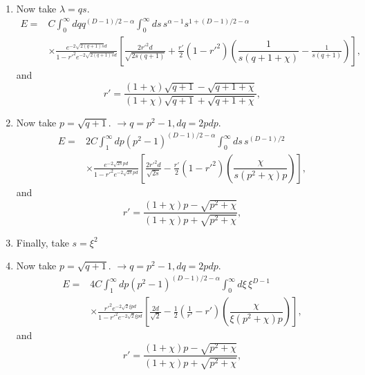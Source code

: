 \begin{enumerate}
\item Now take $\lambda = qs$.  
 \begin{align}
E=&  C\int_0^\infty dq q^{(D-1)/2-\alpha}\int_0^\infty ds\, s^{\alpha-1}s^{1+(D-1)/2-\alpha}\nonumber\\
&\times  \frac{e^{-2\sqrt{2(q+1)s}d}}{1-r'^2e^{-2\sqrt{2(q+1)s}d}}\left[
\frac{2r'^2d}{\sqrt{2s(q+1)}}+ \frac{r'}{2}(1-r'^2)\left(\dfrac{1}{s(q+1+\chi)}  -\frac{1}{s(q+1)}\right)\right],
\end{align}
and 
\begin{equation}
r' =  \frac{(1+\chi)\sqrt{q+1}-\sqrt{q+ 1 + \chi}}{(1+\chi)\sqrt{q+1}+\sqrt{q+1+\chi}},
\end{equation}
\item Now take $p = \sqrt{q+1}$.  $\rightarrow  q = p^2-1, dq = 2p dp$.  
 \begin{align}
E%
=&  2C\int_1^\infty dp (p^2-1)^{(D-1)/2-\alpha}\int_0^\infty ds\, s^{(D-1)/2}\nonumber\\
&\times\frac{e^{-2\sqrt{2s}pd}}{1-r'^2e^{-2\sqrt{2s}pd}}\left[\frac{2r'^2d}{\sqrt{2s}}- 
\frac{r'}{2}(1-r'^2)\left(\dfrac{\chi}{s(p^2+\chi)p}\right)\right],
\end{align}
and 
\begin{equation}
r' =  \frac{(1+\chi)p-\sqrt{p^2 + \chi}}{(1+\chi)p+\sqrt{p^2+\chi}},
\end{equation}
\item Finally, take 
$s = \xi^2$
\item Now take $p = \sqrt{q+1}$.  $\rightarrow  q = p^2-1, dq = 2p dp$.  
 \begin{align}
E%
=&  4C\int_1^\infty dp (p^2-1)^{(D-1)/2-\alpha}\int_0^\infty d\xi\,\xi^{D-1}\nonumber\\
&\times  \frac{r'^2e^{-2\sqrt{2}\xi pd}}{1-r'^2e^{-2\sqrt{2}\xi pd}}\left[\frac{2d}{\sqrt{2}}-
 \frac{1}{2}\left(\frac{1}{r'}-r'\right)\left(\dfrac{\chi}{\xi(p^2+\chi)p}\right)\right],
\end{align}
and 
\begin{equation}
r' =  \frac{(1+\chi)p-\sqrt{p^2 + \chi}}{(1+ \chi)p+\sqrt{p^2+\chi}},
\end{equation}


\end{enumerate}
